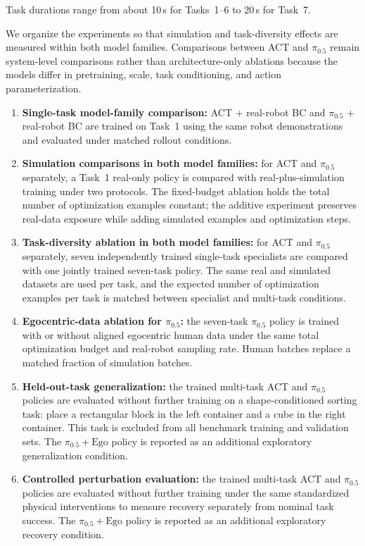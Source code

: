 \documentclass[10pt,conference]{IEEEtran}
\begin{document}
Task durations range from about 10\,s for Tasks~1--6 to 20\,s for Task~7.

We organize the experiments so that simulation and task-diversity effects are
measured within both model families. Comparisons between ACT and $\pi_{0.5}$
remain system-level comparisons rather than architecture-only ablations because
the models differ in pretraining, scale, task conditioning, and action
parameterization.

\begin{enumerate}[leftmargin=*,label=\textbf{E\arabic*.}]
    \item \textbf{Single-task model-family comparison:} ACT + real-robot BC and
    $\pi_{0.5}$ + real-robot BC are trained on Task~1 using the same robot
    demonstrations and evaluated under matched rollout conditions.

    \item \textbf{Simulation comparisons in both model families:} for ACT and
    $\pi_{0.5}$ separately, a Task~1 real-only policy is compared with
    real-plus-simulation training under two protocols. The fixed-budget
    ablation holds the total number of optimization examples constant; the
    additive experiment preserves real-data exposure while adding simulated
    examples and optimization steps.

    \item \textbf{Task-diversity ablation in both model families:} for ACT and
    $\pi_{0.5}$ separately, seven independently trained single-task specialists
    are compared with one jointly trained seven-task policy. The same real and
    simulated datasets are used per task, and the expected number of
    optimization examples per task is matched between specialist and multi-task
    conditions.

    \item \textbf{Egocentric-data ablation for $\pi_{0.5}$:} the seven-task
    $\pi_{0.5}$ policy is trained with or without aligned egocentric human data
    under the same total optimization budget and real-robot sampling rate.
    Human batches replace a matched fraction of simulation batches.

    \item \textbf{Held-out-task generalization:} the trained multi-task ACT and
    $\pi_{0.5}$ policies are evaluated without further training on a
    shape-conditioned sorting task: place a rectangular block in the left
    container and a cube in the right container. This task is excluded from all
    benchmark training and validation sets. The $\pi_{0.5}+\mathrm{Ego}$ policy
    is reported as an additional exploratory generalization condition.

    \item \textbf{Controlled perturbation evaluation:} the trained multi-task
    ACT and $\pi_{0.5}$ policies are evaluated without further training under
    the same standardized physical interventions to measure recovery separately
    from nominal task success. The $\pi_{0.5}+\mathrm{Ego}$ policy is reported
    as an additional exploratory recovery condition.
\end{enumerate}
\end{document}
